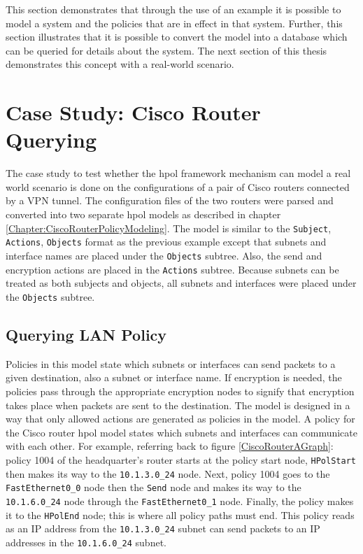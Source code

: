 \documentclass[12pt,letterpaper]{report}
\begin{document}
This section demonstrates that through the use of an example it is possible to model a system and the policies that are in effect in that system. Further, this section illustrates that it is possible to convert the model into a database which can be queried for details about the system. The next section of this thesis demonstrates this concept with a real-world scenario.

\chapter{Case Study: Cisco Router Querying}
\label{Chapter:CiscoPolicyQuerying}
The case study to test whether the \ac{hpol} framework mechanism can model a real world scenario is done on the configurations of a pair of Cisco routers connected by a VPN tunnel. The configuration files of the two routers were parsed and converted into two separate \ac{hpol} models as described in chapter \ref{Chapter:CiscoRouterPolicyModeling}. The model is similar to the \texttt{Subject}, \texttt{Actions}, \texttt{Objects} format as the previous example except that subnets and interface names are placed under the \texttt{Objects} subtree. Also, the send and encryption actions are placed in the \texttt{Actions} subtree. Because subnets can be treated as both subjects and objects, all subnets and interfaces were placed under the \texttt{Objects} subtree. 

\section{Querying LAN Policy}
Policies in this model state which subnets or interfaces can send packets to a given destination, also a subnet or interface name. If encryption is needed, the policies pass through the appropriate encryption nodes to signify that encryption takes place when packets are sent to the destination. The model is designed in a way that only allowed actions are generated as policies in the model. A policy for the Cisco router \ac{hpol} model states which subnets and interfaces can communicate with each other. For example, referring back to figure \ref{CiscoRouterAGraph}: policy 1004 of the headquarter's router starts at the policy start node, \texttt{HPolStart} then makes its way to the \texttt{10.1.3.0\_24} node. Next, policy 1004 goes to the \texttt{FastEthernet0\_0} node then the \texttt{Send} node and makes its way to the \texttt{10.1.6.0\_24} node through the \texttt{FastEthernet0\_1} node. Finally, the policy makes it to the \texttt{HPolEnd} node; this is where all policy paths must end. This policy reads as an IP address from the \texttt{10.1.3.0\_24} subnet can send packets to an IP addresses in the  \texttt{10.1.6.0\_24} subnet. 
\end{document}
